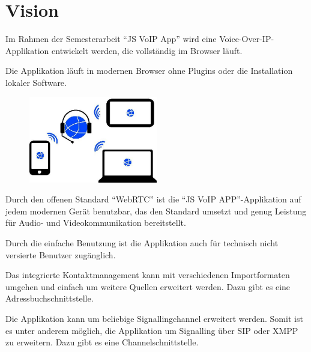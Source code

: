   \chapter{Vision}
	Im Rahmen der Semesterarbeit ``JS VoIP App'' wird eine
	Voice-Over-IP-Applikation entwickelt werden, die vollständig im Browser läuft.
	
	Die Applikation läuft in modernen Browser ohne Plugins oder die Installation lokaler Software.
			
	\begin{figure}[H]
		\centering
		\includegraphics[width=0.5\textwidth]{img/plattformUnabhaengigkeit.jpg}
		\label{plattformUnabhaengigkeit}
	\end{figure}
	
	Durch den offenen Standard ``WebRTC'' ist die ``JS VoIP APP''-Applikation auf jedem modernen Gerät benutzbar, das den Standard umsetzt und genug Leistung für Audio- und Videokommunikation bereitstellt.
	
	Durch die einfache Benutzung ist die Applikation auch für technisch nicht
	versierte Benutzer zugänglich.
	
	Das integrierte Kontaktmanagement kann mit verschiedenen Importformaten umgehen und einfach um weitere Quellen erweitert werden. Dazu gibt es eine Adressbuchschnittstelle.
	
	Die Applikation kann um beliebige Signallingchannel erweitert werden. Somit ist
	es unter anderem möglich, die Applikation um Signalling über SIP oder XMPP zu
	erweitern. Dazu gibt es eine Channelschnittstelle.
	
		